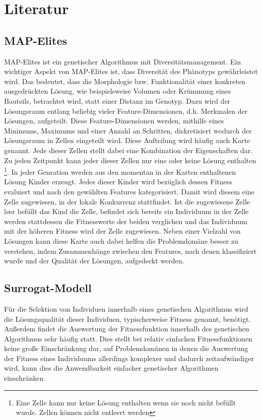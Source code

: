 \documentclass[12pt]{article}
\begin{document}
\section{Literatur}

\subsection{MAP-Elites}
\label{sub:mapElites}
MAP-Elites \cite{Mouret.4202015} ist ein genetischer Algorithmus mit Diversitätsmanagement.
Ein wichtiger Aspekt von MAP-Elites ist, dass Diversität des Phänotyps gewährleistet wird.
Das bedeutet, dass die Morphologie bzw. Funktionalität einer konkreten ausgedrückten Lösung, wie beispielsweise Volumen oder Krümmung eines Bauteils, betrachtet wird, statt einer Distanz im Genotyp.
Dazu wird der Lösungsraum entlang beliebig vieler Feature-Dimensionen, d.h. Merkmalen der Lösungen, aufgeteilt.
Diese Feature-Dimensionen werden, mithilfe eines Minimums, Maximums und einer Anzahl an Schritten, diskretisiert wodurch der Lösungsraum in Zellen eingeteilt wird.
Diese Aufteilung wird häufig auch Karte genannt.
Jede dieser Zellen stellt dabei eine Kombination der Eigenschaften dar.
Zu jeden Zeitpunkt kann jeder dieser Zellen nur eine oder keine Lösung enthalten
\footnote{Eine Zelle kann nur keine Lösung enthalten wenn sie noch nicht befüllt wurde. Zellen können nicht entleert werden}.
In jeder Genration werden aus den momentan in der Karten enthaltenen Lösung Kinder erzeugt.
Jedes dieser Kinder wird bezüglich dessen Fitness evaluiert und nach den gewählten Features kategorisiert.
Damit wird diesem eine Zelle zugewiesen, in der lokale Konkurrenz stattfindet.
Ist die zugewiesene Zelle leer befüllt das Kind die Zelle, befindet sich bereits ein Individuum in der Zelle werden stattdessen die Fitnesswerte der beiden verglichen und das Individuum mit der höheren Fitness wird der Zelle zugewiesen.
Neben einer Vielzahl von Lösungen kann diese Karte auch dabei helfen die Problemdomäne besser zu verstehen, indem Zusammenhänge zwischen den Features, nach denen klassifiziert wurde und der Qualität der Lösungen, aufgedeckt werden.

\subsection{Surrogat-Modell}
\label{sub:surrogate}
Für die Selektion von Individuen innerhalb eines genetischen Algorithmus wird die Lösungsqualität dieser Individuen, typischerweise Fitness genannt, benötigt.
Außerdem findet die Auswertung der Fitnessfunktion innerhalb des genetischen Algorithmus sehr häufig statt.
Dies stellt bei relativ einfachen Fitnessfunktionen keine große Einschränkung dar, auf Problemdomänen in denen die Auswertung der Fitness eines Individuums allerdings komplexer und dadurch zeitaufwändiger wird, kann dies die Anwendbarkeit einfacher genetischer Algorithmen einschränken.
\end{document}
